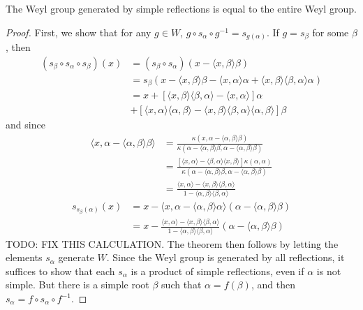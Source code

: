 \begin{corollary}
    The Weyl group generated by simple reflections is equal to the entire Weyl group.
\end{corollary}
\begin{proof}
    First, we show that for any $g \in W$, $g \circ s_\alpha \circ g^{-1} = s_{g(\alpha)}$. If $g = s_\beta$ for some $\beta$, then
    \begin{align*}
        (s_\beta \circ s_\alpha \circ s_\beta)(x) &= (s_\beta \circ s_\alpha)(x - \langle x, \beta \rangle \beta)\\
        &= s_\beta(x - \langle x, \beta \rangle \beta - \langle x, \alpha \rangle \alpha + \langle x, \beta \rangle \langle \beta, \alpha \rangle \alpha)\\
        &= x + [\langle x, \beta \rangle \langle \beta, \alpha \rangle - \langle x, \alpha \rangle] \alpha\\
        &+ [\langle x, \alpha \rangle \langle \alpha, \beta \rangle - \langle x,\beta \rangle \langle \beta, \alpha \rangle \langle \alpha, \beta \rangle] \beta
    \end{align*}
    and since
    \begin{align*}
        \langle x, \alpha - \langle \alpha, \beta \rangle \beta \rangle &= \frac{\kappa(x, \alpha - \langle \alpha, \beta \rangle \beta)}{\kappa(\alpha - \langle \alpha, \beta \rangle \beta, \alpha - \langle \alpha, \beta \rangle \beta)}\\
        &= \frac{[\langle x, \alpha \rangle - \langle \beta, \alpha \rangle \langle x,\beta \rangle] \kappa(\alpha, \alpha)}{\kappa(\alpha - \langle \alpha, \beta \rangle \beta, \alpha - \langle \alpha, \beta \rangle \beta)}\\
        &= \frac{\langle x, \alpha \rangle - \langle x, \beta \rangle \langle \beta, \alpha \rangle}{1 - \langle \alpha, \beta \rangle \langle \beta, \alpha \rangle}
    \end{align*}
    \begin{align*}
        s_{s_\beta(\alpha)}(x) &= x - \langle x, \alpha - \langle \alpha, \beta \rangle \alpha \rangle (\alpha - \langle \alpha, \beta \rangle \beta) \\
        &= x - \frac{\langle x, \alpha \rangle - \langle x, \beta \rangle \langle \beta, \alpha \rangle}{1 - \langle \alpha, \beta \rangle \langle \beta, \alpha \rangle} (\alpha - \langle \alpha, \beta \rangle \beta)
    \end{align*}
    TODO: FIX THIS CALCULATION. The theorem then follows by letting the elements $s_\alpha$ generate $W$. Since the Weyl group is generated by all reflections, it suffices to show that each $s_\alpha$ is a product of simple reflections, even if $\alpha$ is not simple. But there is a simple root $\beta$ such that $\alpha = f(\beta)$, and then $s_\alpha = f \circ s_\alpha \circ f^{-1}$.
\end{proof}

